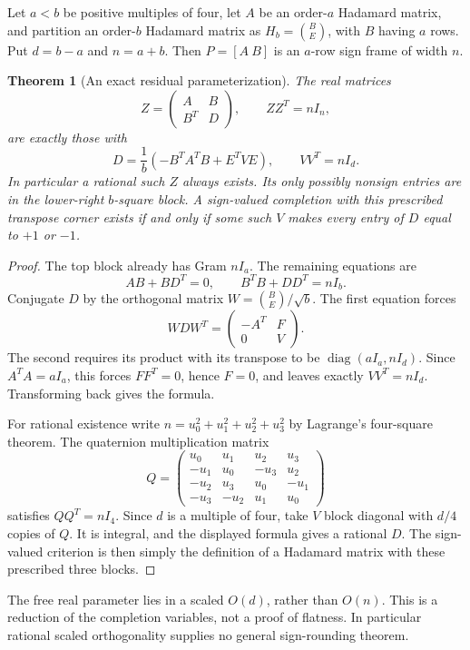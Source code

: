 \documentclass[11pt]{article}
\newtheorem{theorem}{Theorem}[section]
\begin{document}
Let $a<b$ be positive multiples of four, let $A$ be an order-$a$
Hadamard matrix, and partition an order-$b$ Hadamard matrix as
$H_b=\binom{B}{E}$, with $B$ having $a$ rows. Put $d=b-a$ and $n=a+b$.
Then $P=[A\ B]$ is an $a$-row sign frame of width $n$.

\begin{theorem}[An exact residual parameterization]
\label{dil:parameterization}
The real matrices
\[
 Z=\begin{pmatrix}A&B\\B^T&D\end{pmatrix},\qquad ZZ^T=nI_n,
\]
are exactly those with
\[
 \boxed{D=\frac1b\left(-B^TA^TB+E^TVE\right),\qquad
                         VV^T=nI_d.}
\]
In particular a rational such $Z$ always exists. Its only possibly
nonsign entries are in the lower-right $b$-square block.
A sign-valued completion with this prescribed transpose corner
exists if and only if some such $V$ makes every entry of $D$ equal
to $+1$ or $-1$.
\end{theorem}
\begin{proof}
The top block already has Gram $nI_a$. The remaining equations are
\[
 AB+BD^T=0,\qquad B^TB+DD^T=nI_b.
\]
Conjugate $D$ by the orthogonal matrix
$W=\binom{B}{E}/\sqrt b$. The first equation forces
\[
 WDW^T=\begin{pmatrix}-A^T&F\\0&V\end{pmatrix}.
\]
The second requires its product with its transpose to be
$\operatorname{diag}(aI_a,nI_d)$.
Since $A^TA=aI_a$, this forces $FF^T=0$, hence $F=0$,
and leaves exactly $VV^T=nI_d$. Transforming back gives the formula.

For rational existence write $n=u_0^2+u_1^2+u_2^2+u_3^2$ by
Lagrange's four-square theorem. The quaternion multiplication matrix
\[
 Q=\begin{pmatrix}
 u_0&u_1&u_2&u_3\\
 -u_1&u_0&-u_3&u_2\\
 -u_2&u_3&u_0&-u_1\\
 -u_3&-u_2&u_1&u_0
 \end{pmatrix}
\]
satisfies $QQ^T=nI_4$. Since $d$ is a multiple of four, take $V$
block diagonal with $d/4$ copies of $Q$. It is integral, and the
displayed formula gives a rational $D$. The sign-valued criterion
is then simply the definition of a Hadamard matrix with these
prescribed three blocks.
\end{proof}

The free real parameter lies in a scaled $O(d)$, rather than $O(n)$.
This is a reduction of the completion variables, not a proof of
flatness. In particular rational scaled orthogonality supplies no
general sign-rounding theorem.
\end{document}
